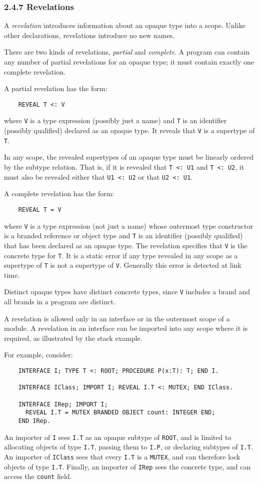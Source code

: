 \documentclass[10pt]{article}
\begin{document}
\subsubsection*{2.4.7 Revelations}

A \emph{revelation} introduces information about an opaque type into a scope.
Unlike other declarations, revelations introduce no new names.

There are two kinds of revelations, \emph{partial} and \emph{complete}.  A
program can contain any number of partial revelations for an opaque type; it
must contain exactly one complete revelation.

A partial revelation has the form:
\begin{verbatim}
    REVEAL T <: V
\end{verbatim}
where \verb|V| is a type expression (possibly just a name) and \verb|T| is an
identifier (possibly qualified) declared as an opaque type.  It reveals that
\verb|V| is a supertype of \verb|T|.

In any scope, the revealed supertypes of an opaque type must be linearly
ordered by the subtype relation.  That is, if it is revealed that
\verb|T <: U1| and \verb|T <: U2|, it must also be revealed either that
\verb|U1 <: U2| or that \verb|U2 <: U1|.

A complete revelation has the form:
\begin{verbatim}
    REVEAL T = V
\end{verbatim}
where \verb|V| is a type expression (not just a name) whose outermost type
constructor is a branded reference or object type and \verb|T| is an
identifier (possibly qualified) that has been declared as an opaque type.  The
revelation specifies that \verb|V| is the concrete type for \verb|T|.  It is a
static error if any type revealed in any scope as a supertype of \verb|T| is
not a supertype of \verb|V|.  Generally this error is detected at link time.

Distinct opaque types have distinct concrete types, since \verb|V| includes a
brand and all brands in a program are distinct.

A revelation is allowed only in an interface or in the outermost scope of a
module.  A revelation in an interface can be imported into any scope where it
is required, as illustrated by the stack example.

For example, consider:
\begin{verbatim}
    INTERFACE I; TYPE T <: ROOT; PROCEDURE P(x:T): T; END I.

    INTERFACE IClass; IMPORT I; REVEAL I.T <: MUTEX; END IClass.

    INTERFACE IRep; IMPORT I;
      REVEAL I.T = MUTEX BRANDED OBJECT count: INTEGER END;
    END IRep.
\end{verbatim}
An importer of \verb|I| sees \verb|I.T| as an opaque subtype of \verb|ROOT|,
and is limited to allocating objects of type \verb|I.T|, passing them to
\verb|I.P|, or declaring subtypes of \verb|I.T|.  An importer of \verb|IClass|
sees that every \verb|I.T| is a \verb|MUTEX|, and can therefore lock objects
of type \verb|I.T|.  Finally, an importer of \verb|IRep| sees the concrete
type, and can access the \verb|count| field.
\end{document}
